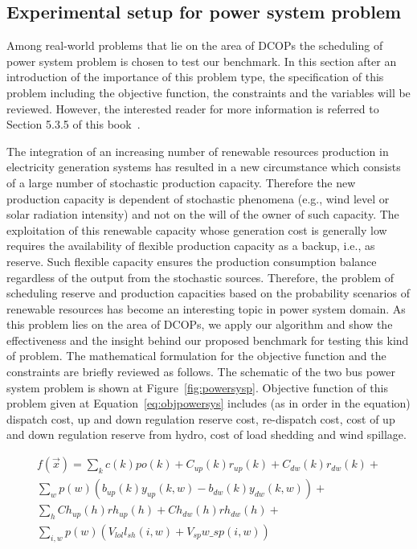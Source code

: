 \documentclass[review]{elsarticle}
\begin{document}
\subsection{Experimental setup for power system problem}
\label{subsec:powersys}
Among real-world problems that lie on the area of DCOPs the scheduling of power system problem is chosen to test our benchmark. In this section after an introduction of the importance of this problem type, the specification of this problem including the objective function, the constraints and the variables will be reviewed. However, the interested reader for more information is referred to Section 5.3.5 of this book~\citep{morales2014managing}.

The integration of an increasing number of renewable resources production in electricity generation systems has resulted in a new circumstance which consists of a large number of stochastic production capacity. Therefore the new production capacity is dependent of stochastic phenomena (e.g., wind level or solar radiation intensity) and not on the will of the owner of such capacity. The exploitation of this renewable capacity whose generation cost is generally low requires the availability of flexible production capacity as a backup, i.e., as reserve. Such flexible capacity ensures the production consumption balance regardless of the output from the stochastic sources. Therefore, the problem of scheduling reserve and production capacities based on the probability scenarios of renewable resources has become an interesting topic in power system domain. As this problem lies on the area of DCOPs, we apply our algorithm and show the effectiveness and the insight behind our proposed benchmark for testing this kind of problem. The mathematical formulation for the objective function and the constraints are briefly reviewed as follows. The schematic of the two bus power system problem is shown at Figure~\ref{fig:powersysp}.
Objective function of this problem given at Equation~\ref{eq:objpowersys} includes (as in order in the equation) dispatch cost, up and down regulation reserve cost, re-dispatch cost, cost of up and down regulation reserve from hydro, cost of load shedding and wind spillage.

\begin{equation}
\label{eq:objpowersys}
 \begin{multlined}
f(\vec{x})=\sum_{k}{c(k)po(k)+C_{up}(k)r_{
up}(k)+C_{dw}(k)r_{dw}(k)}+\\
\sum_{w}{p(w)(
b_{up}(k)y_{up}(k,w)-b_{dw}(k)y_{dw}(k,w))}+\\
\sum_{h}{Ch_{up}(h)rh_{
up}(h)+Ch_{dw}(h)rh_{dw}(h)}+\\
\sum_{i,w}{p(w)(V_{lol} l_{sh}(i,w)+V_{sp} w\_sp(i,w))}
 \end{multlined}
\end{equation}
\end{document}
